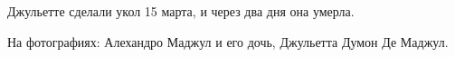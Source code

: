Джульетте сделали укол 15 марта, и через два дня она умерла.

На фотографиях: Алехандро Маджул и его дочь, Джульетта Думон Де Маджул.
